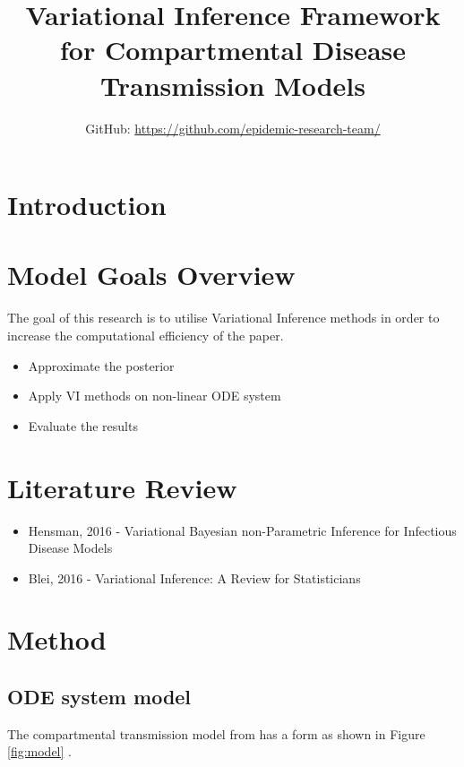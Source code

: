\documentclass[12pt]{article}
\title{Variational Inference Framework for Compartmental Disease Transmission Models}
\author{GitHub: \url{https://github.com/epidemic-research-team/}}
\begin{document}
\maketitle

\section{Introduction}

\section{Model Goals Overview}

The goal of this research is to utilise Variational Inference methods in order to increase the computational efficiency of the \cite{Gareth:2013} paper. 

\begin{itemize}
\item Approximate the posterior 
\item Apply VI methods on non-linear ODE system
\item Evaluate the results
\end{itemize}

\section{Literature Review}

\begin{itemize}
\item Hensman, 2016 - Variational Bayesian non-Parametric Inference for Infectious Disease Models
\item Blei, 2016 - Variational Inference: A Review for Statisticians
\end{itemize}


\section{Method}

\subsection{ODE system model}

The compartmental transmission model from \cite{Gareth:2013} has a form as shown in Figure \ref{fig:model} \cite[p.5]{Gareth:2013}. 
\end{document}
